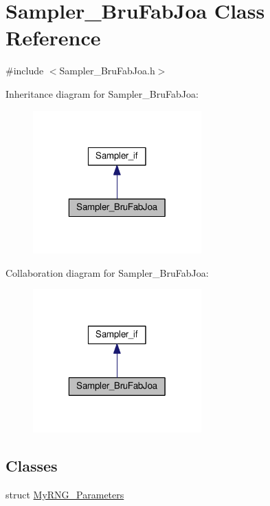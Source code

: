 \hypertarget{class_sampler___bru_fab_joa}{\section{Sampler\-\_\-\-Bru\-Fab\-Joa Class Reference}
\label{class_sampler___bru_fab_joa}
}


{\ttfamily \#include $<$Sampler\-\_\-\-Bru\-Fab\-Joa.\-h$>$}



Inheritance diagram for Sampler\-\_\-\-Bru\-Fab\-Joa\-:
\nopagebreak
\begin{figure}[H]
\begin{center}
\leavevmode
\includegraphics[width=184pt]{class_sampler___bru_fab_joa__inherit__graph}
\end{center}
\end{figure}


Collaboration diagram for Sampler\-\_\-\-Bru\-Fab\-Joa\-:
\nopagebreak
\begin{figure}[H]
\begin{center}
\leavevmode
\includegraphics[width=184pt]{class_sampler___bru_fab_joa__coll__graph}
\end{center}
\end{figure}
\subsection*{Classes}
\begin{DoxyCompactItemize}
\item 
struct \hyperlink{struct_sampler___bru_fab_joa_1_1_my_r_n_g___parameters}{My\-R\-N\-G\-\_\-\-Parameters}
\end{DoxyCompactItemize}

